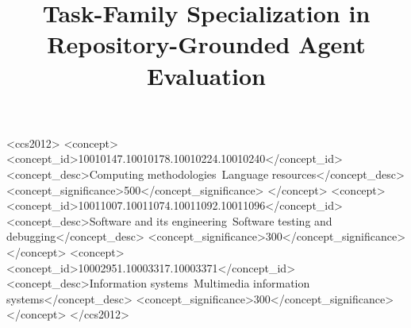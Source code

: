 \documentclass[sigconf,screen,anonymous,nonacm]{acmart}
\begin{document}
\title{Task-Family Specialization in Repository-Grounded Agent Evaluation}

\begin{CCSXML}
<ccs2012>
<concept>
<concept_id>10010147.10010178.10010224.10010240</concept_id>
<concept_desc>Computing methodologies~Language resources</concept_desc>
<concept_significance>500</concept_significance>
</concept>
<concept>
<concept_id>10011007.10011074.10011092.10011096</concept_id>
<concept_desc>Software and its engineering~Software testing and debugging</concept_desc>
<concept_significance>300</concept_significance>
</concept>
<concept>
<concept_id>10002951.10003317.10003371</concept_id>
<concept_desc>Information systems~Multimedia information systems</concept_desc>
<concept_significance>300</concept_significance>
</concept>
</ccs2012>
\end{CCSXML}


\begin{abstract}

\end{abstract}


\maketitle










\end{document}
